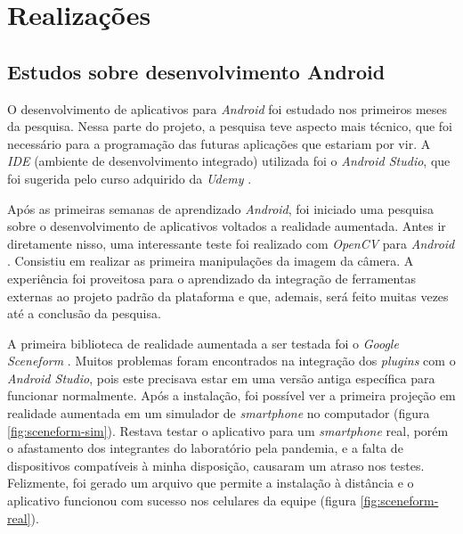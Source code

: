 \chapter{Realizações}\label{chp:realizacoes}

\section{Estudos sobre desenvolvimento Android}

O desenvolvimento de aplicativos para \textit{Android} foi estudado nos primeiros meses da pesquisa. Nessa parte do projeto, a pesquisa teve aspecto mais técnico, que foi necessário para a programação das futuras aplicações que estariam por vir. A \textit{IDE} (ambiente de desenvolvimento integrado) utilizada foi o \textit{Android Studio}, que foi sugerida pelo curso adquirido da \textit{Udemy} \cite{udemy}.

Após as primeiras semanas de aprendizado \textit{Android}, foi iniciado uma pesquisa sobre o desenvolvimento de aplicativos voltados a realidade aumentada. Antes ir diretamente nisso, uma interessante teste foi realizado com \textit{OpenCV} para \textit{Android} \cite{opencv}. Consistiu em realizar as primeira manipulações da imagem da câmera. A experiência foi proveitosa para o aprendizado da integração de ferramentas externas ao projeto padrão da plataforma e que, ademais, será feito muitas vezes até a conclusão da pesquisa.

A primeira biblioteca de realidade aumentada a ser testada foi o \textit{Google Sceneform} \cite{Sceneform}. Muitos problemas foram encontrados na integração dos \textit{plugins} com o \textit{Android Studio}, pois este precisava estar em uma versão antiga específica para funcionar normalmente. Após a instalação, foi possível ver a primeira projeção em realidade aumentada em um simulador de \textit{smartphone} no computador (figura \ref{fig:sceneform-sim}). Restava testar o aplicativo para um \textit{smartphone} real, porém o afastamento dos integrantes do laboratório pela pandemia, e a falta de dispositivos compatíveis à minha disposição, causaram um atraso nos testes. Felizmente, foi gerado um arquivo que permite a instalação à distância e o aplicativo funcionou com sucesso nos celulares da equipe (figura \ref{fig:sceneform-real}).

